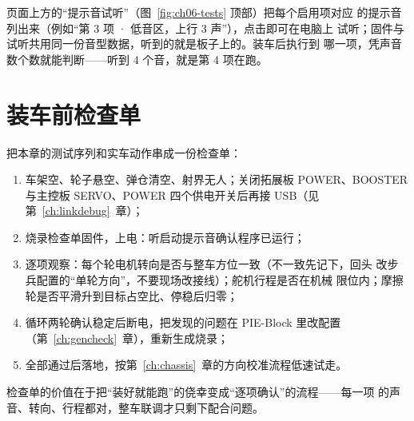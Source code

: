 页面上方的“提示音试听”（图~\ref{fig:ch06-tests} 顶部）把每个启用项对应
的提示音列出来（例如“第 3 项 · 低音区，上行 3 声”），点击即可在电脑上
试听；固件与试听共用同一份音型数据，听到的就是板子上的。装车后执行到
哪一项，凭声音数个数就能判断——听到 4 个音，就是第 4 项在跑。

\section{装车前检查单}

把本章的测试序列和实车动作串成一份检查单：

\begin{enumerate}
  \item 车架空、轮子悬空、弹仓清空、射界无人；关闭拓展板 POWER、BOOSTER
        与主控板 SERVO、POWER 四个供电开关后再接 USB（见
        第~\ref{ch:linkdebug}~章）；
  \item 烧录检查单固件，上电：听启动提示音确认程序已运行；
  \item 逐项观察：每个轮电机转向是否与整车方位一致（不一致先记下，回头
        改步兵配置的“单轮方向”，不要现场改接线）；舵机行程是否在机械
        限位内；摩擦轮是否平滑升到目标占空比、停稳后归零；
  \item 循环两轮确认稳定后断电，把发现的问题在 PIE-Block 里改配置
        （第~\ref{ch:gencheck}~章），重新生成烧录；
  \item 全部通过后落地，按第~\ref{ch:chassis}~章的方向校准流程低速试走。
\end{enumerate}

检查单的价值在于把“装好就能跑”的侥幸变成“逐项确认”的流程——每一项
的声音、转向、行程都对，整车联调才只剩下配合问题。
